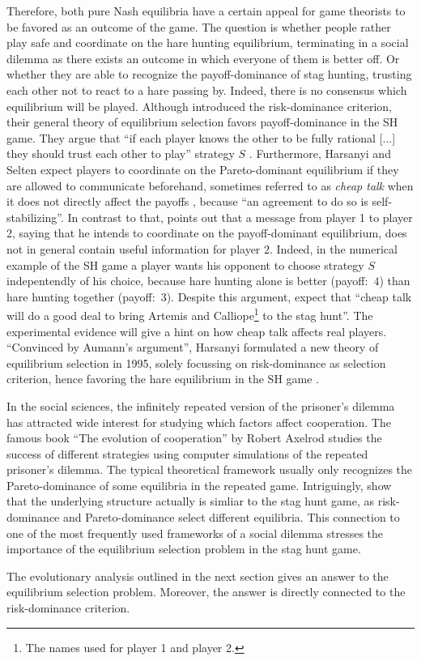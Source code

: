 Therefore, both pure Nash equilibria have a 
certain appeal for game theorists to be
favored as an outcome of the game. 
The question is whether people rather play
safe and coordinate on the hare hunting equilibrium, terminating in a social
dilemma as there exists an outcome in which everyone of them is better off.
Or whether they are able to recognize the payoff-dominance of stag hunting, 
trusting each other not to react to a hare passing by.
Indeed, there is no consensus which equilibrium will be played. 
Although \textcite{harsanyi_general_1988} introduced the 
risk-dominance criterion, their general theory of equilibrium 
selection favors payoff-dominance in the SH game. They argue that
``if each player knows the other to be fully rational [...] they should trust
each other to play'' strategy $S$ \parencite[89]{harsanyi_general_1988}.
Furthermore, Harsanyi and Selten expect players to coordinate on the
Pareto-dominant equilibrium if they are allowed to communicate beforehand,
sometimes referred to as \textit{cheap talk} when it does not directly affect
the payoffs \parencite[104]{farrell_cheap_1996}, 
because ``an agreement to do so is self-stabilizing''. 
In contrast to that,
\textcite{aumann_nash_1990} points out that a message from player 1 to 
player 2, saying that he intends to coordinate on the payoff-dominant 
equilibrium, does not in general contain useful information for player 2. 
Indeed, in the numerical example of the SH game a player wants his
opponent to choose strategy $S$ indepentendly of his choice, because
hare hunting alone is better (payoff:\ $4$) than hare hunting together 
(payoff:\ $3$).
Despite this argument, 
\textcite[114]{farrell_cheap_1996} expect that 
``cheap talk will do a good deal to
bring Artemis and Calliope\footnote{The names
\textcite{farrell_cheap_1996} used for player 1 and player 2.} 
to the stag hunt''. The experimental evidence will give a hint on how cheap
talk affects real players. 
``Convinced by Aumann's argument'', Harsanyi formulated a new theory
of equilibrium selection in 1995, solely focussing on 
risk-dominance as selection criterion, hence favoring the hare 
equilibrium in the SH game \parencite[92,94,96]{harsanyi_new_1995}. 

In the social sciences, the infinitely repeated version of the
prisoner's dilemma has attracted wide interest for studying which factors 
affect cooperation. The famous book ``The evolution of cooperation'' by Robert
Axelrod studies the success of different strategies using computer 
simulations of the repeated prisoner's dilemma. The typical theoretical
framework usually only recognizes the Pareto-dominance of some equilibria
in the repeated game. Intriguingly, \textcite{blonski_prisoners_2015} show
that the underlying structure actually is simliar to the stag hunt game, 
as risk-dominance and Pareto-dominance select different equilibria. 
This connection to 
one of the most frequently used frameworks of a social dilemma stresses the
importance of the equilibrium selection problem in the stag hunt game.

The evolutionary analysis outlined in the next section gives an answer
to the equilibrium selection problem. Moreover, the answer is directly
connected to the risk-dominance criterion.
